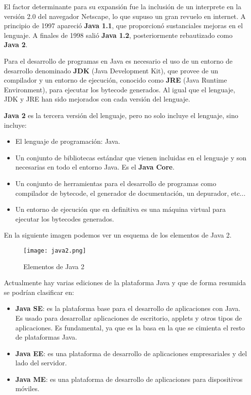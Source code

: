 El factor determinante para su expansión fue la inclusión de un interprete en la versión 2.0 del navegador Netscape, lo que supuso un gran revuelo en internet. A principio de 1997 apareció \textbf{Java 1.1}, que proporcionó sustanciales mejoras en el lenguaje. A finales de 1998 salió \textbf{Java 1.2}, posteriormente rebautizado como \textbf{Java 2}.

Para el desarrollo de programas en Java es necesario el uso de un entorno de desarrollo denominado \textbf{JDK} (Java Development Kit), que provee de un compilador y un entorno de ejecución, conocido como \textbf{JRE} (Java Runtime Environment), para ejecutar los bytecode generados. Al igual que el lenguaje, JDK y JRE han sido mejorados con cada versión del lenguaje.

\textbf{Java 2} es la tercera versión del lenguaje, pero no solo incluye el lenguaje, sino incluye:

\begin{itemize}
    \item El lenguaje de programación: Java.
    \item Un conjunto de bibliotecas estándar que vienen incluidas en el lenguaje y son necesarias en todo el entorno Java. Es el \textbf{Java Core}.
    \item Un conjunto de herramientas para el desarrollo de programas como compilador de bytecode, el generador de documentación, un depurador, etc...
    \item Un entorno de ejecución que en definitiva es una máquina virtual para ejecutar los bytecodes generados.
\end{itemize}

En la siguiente imagen podemos ver un esquema de los elementos de Java 2.

\begin{figure}[H]
    \centering
    \texttt{[image: java2.png]}
    \caption{Elementos de Java 2}
\end{figure}

Actualmente hay varias ediciones de la plataforma Java y que de forma resumida se podrían clasificar en:

\begin{itemize}
    \item \textbf{Java SE}: es la plataforma base para el desarrollo de aplicaciones con Java. Es usado para desarrollar aplicaciones de escritorio, applets y otros tipos de aplicaciones. Es fundamental, ya que es la basa en la que se cimienta el resto de plataformas Java.
    \item \textbf{Java EE}: es una plataforma de desarrollo de aplicaciones empresariales y del lado del servidor.
    \item \textbf{Java ME}: es una plataforma de desarrollo de aplicaciones para dispositivos móviles.
\end{itemize}

